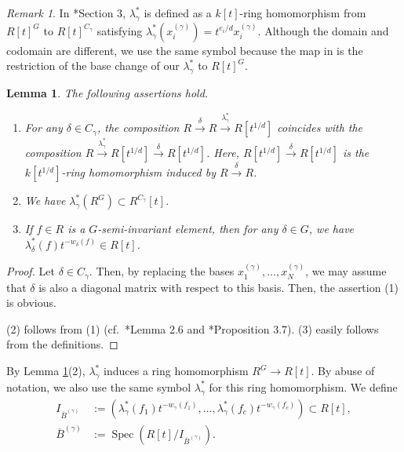 \documentclass[a4paper,11pt]{amsart}
\newtheorem{lem}[thm]{Lemma}
\theoremstyle{definition}
\theoremstyle{remark}
\newtheorem{rmk}[thm]{Remark}
\begin{document}
\begin{rmk}
In \cite{NS22}*{Section 3}, $\lambda^*_{\gamma}$ is defined as a $k[t]$-ring homomorphism from $R[t]^G$ to $R[t]^{C_{\gamma}}$ satisfying $\lambda^*_{\gamma} (x_i^{(\gamma)}) = t^{e_i/d}x_i^{(\gamma)}$. 
Although the domain and codomain are different, we use the same symbol because the map in \cite{NS22} is the restriction of the base change of our $\lambda^*_{\gamma}$ to $R[t]^G$.
\end{rmk}


\begin{lem}\label{lem:lambda}
The following assertions hold. 
\begin{enumerate}
\item 
For any $\delta \in C_{\gamma}$, the composition $R \xrightarrow{\delta} R \xrightarrow{\lambda ^* _{\gamma}} R[t^{1/d}]$ coincides with the composition $R \xrightarrow{\lambda ^* _{\gamma}} R[t^{1/d}] \xrightarrow{\delta} R[t^{1/d}]$. 
Here, $R[t^{1/d}] \xrightarrow{\delta} R[t^{1/d}]$ is the $k[t^{1/d}]$-ring homomorphism induced by $R \xrightarrow{\delta} R$.

\item
We have 
$\lambda^* _{\gamma} \left( R^G \right) \subset R^{C_{\gamma}}[t]$. 

\item 
If $f \in R$ is a $G$-semi-invariant element, then 
for any $\delta \in G$, we have $\lambda ^* _{\delta}(f)t^{-w_{\delta}(f)} \in R[t]$.
\end{enumerate}
\end{lem}
\begin{proof} 
Let $\delta \in C_{\gamma}$. Then, by replacing the bases $x_1^{(\gamma)}, \ldots, x_N^{(\gamma)}$, we may assume that $\delta$ is also a diagonal matrix with respect to this basis. 
Then, the assertion (1) is obvious. 

(2) follows from (1) (cf.\ \cite{DL02}*{Lemma 2.6} and \cite{NS22}*{Proposition 3.7}). (3) easily follows from the definitions. 
\end{proof}

By Lemma \ref{lem:lambda}(2), $\lambda^* _{\gamma}$ induces a ring homomorphism 
$R^G \to R[t]$. By abuse of notation, we also use the same symbol $\lambda^* _{\gamma}$ for this ring homomorphism. 
We define 
\begin{align*}
I_{\overline{B}^{(\gamma)}} 
&:= \left( \lambda ^* _{\gamma}(f_1)t^{-w_\gamma(f_1)}, \ldots , \lambda ^* _{\gamma}(f_c)t^{-w_\gamma(f_c)} \right)
\subset R[t], \\ 
\overline{B}^{(\gamma)} 
&:= \operatorname{Spec} \left(R[t]/I_{\overline{B}^{(\gamma)}}\right). 
\end{align*}
\end{document}

